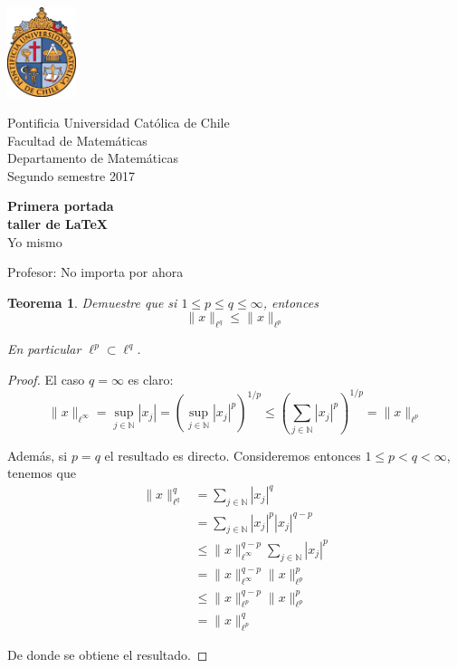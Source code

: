 \documentclass{article}
\newcommand{\N}{\mathbb{N}}
\newtheorem{teo}{Teorema}
\begin{document}
\begin{titlepage}
	\begin{minipage}{2.5cm}
		\includegraphics[width=2cm]{logouccolor.png}
	\end{minipage}
	\begin{minipage}{13 cm}
		\begin{flushleft}
   			\noindent\large{\sc
				Pontificia Universidad Católica de Chile \\ 
		     		Facultad de Matemáticas \\ 
		     		Departamento de Matemáticas \\ 
				Segundo semestre 2017
		     	}
		\end{flushleft}
	\end{minipage}
	
\begin{center}
	\vspace*{\fill}
		\Huge\textbf{Primera portada}	\\
		\Huge\textbf{taller de \LaTeX}	\\
		\LARGE{Yo mismo} \\
	\vspace*{\fill}
		
	\vfill
		
	\Large{Profesor: No importa por ahora}
\end{center}
\end{titlepage}

\begin{teo} Demuestre que si $1 \leq p \leq q \leq \infty$, entonces
	$$\|x\|_{\ell^{q}} \leq \|x\|_{\ell^{p}}$$
	
En particular $\ell^{p} \subset \ell^{q}$.
\end{teo}

\begin{proof} El caso $q = \infty$ es claro:
	$$\|x\|_{\ell^{\infty}} 
		= 	\sup_{j \in \N} |x_{j}|
		= 	\left(\sup_{j \in \N} |x_{j}|^{p}\right)^{1/p} 
		\leq	\left(\sum_{j \in \N} |x_{j}|^{p}\right)^{1/p} = \|x\|_{\ell^{p}}
	$$

Además, si $p = q$ el resultado es directo. Consideremos entonces $1 \leq p < q < \infty$, tenemos que
	\begin{align*}
		\|x\|_{\ell^{q}}^{q}
			&=		\sum_{j \in \N} |x_{j}|^{q}	\\
			&=		\sum_{j \in \N} |x_{j}|^{p} |x_{j}|^{q-p}	\\
			&\leq		\|x\|^{q-p}_{\ell^{\infty}} \sum_{j \in \N} |x_{j}|^{p}	\\
			&=		\|x\|^{q-p}_{\ell^{\infty}} \|x\|_{\ell^{p}}^{p}	\\
			&\leq		\|x\|^{q-p}_{\ell^{p}} \|x\|_{\ell^{p}}^{p}	\\
			&=		\|x\|_{\ell^{p}}^{q}		 
	\end{align*}

De donde se obtiene el resultado.
\end{proof}                                          
\end{document}
